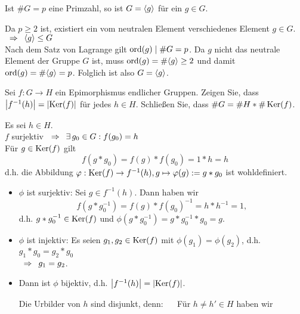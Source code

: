 \begin{exercisePage}
%
\setcounter{taskcount}{5}
%

\begin{exercise}
	Ist $\# G = p$ eine Primzahl, so ist $G = \langle g \rangle$ für ein $g \in G$.
\end{exercise}
\begin{solution}
	Da $p \geq 2$ ist, existiert ein vom neutralen Element verschiedenes Element $g \in G$. \\
	$\enskip \Rightarrow \enskip \langle g \rangle \leq G$ \\
	Nach dem Satz von Lagrange gilt $\operatorname{ord}(g) \mid \# G = p$. Da $g$ nicht das neutrale Element der Gruppe $G$ ist, muss $\operatorname{ord}(g) = \# \langle g \rangle \geq 2$  und damit $\operatorname{ord}(g) = \# \langle g \rangle = p$. Folglich ist also $G = \langle g \rangle$.
\end{solution}
%
\begin{exercise}
	Sei $f: G \to H$ ein Epimorphismus endlicher Gruppen. Zeigen Sie, dass $\left| f^{-1}(h) \right| = \left| \operatorname{Ker}(f) \right|$ für jedes $h \in H$. Schließen Sie, dass $\# G = \# H * \# \operatorname{Ker}(f)$.
\end{exercise}
\begin{solution}
	Es sei $h \in H$. \\
	$f$ surjektiv $\enskip \Rightarrow \enskip \exists \, g_0 \in G : f(g_0)=h$ \\
	Für $g \in \operatorname{Ker} (f)$ gilt 
	\begin{equation*}
		f(g*g_0) = f(g) * f(g_0) = 1 * h = h
	\end{equation*}
	d.h. die Abbildung $\varphi :  \operatorname{Ker}(f) \to f^{-1}(h), g \mapsto \varphi(g) := g * g_0$ ist wohldefiniert.
	\begin{itemize}
		\item $\phi$ ist surjektiv: Sei $g \in f^{-1}(h)$. Dann haben wir
		\begin{equation*}
			f(g*g_0^{-1}) = f(g) * f(g_0)^{-1} = h * h^{-1} = 1,
		\end{equation*}
		d.h. $g*g_0^{-1} \in \operatorname{Ker}(f)$ und $\phi(g*g_0^{-1})=g*g_0^{-1}*g_0 = g$.
		\item $\phi$ ist injektiv: Es seien $g_1,g_2 \in \operatorname{Ker}(f)$ mit $\phi(g_1) = \phi(g_2)$, d.h. $g_1 * g_0 = g_2 * g_0$ \\
		$\enskip \Rightarrow \enskip g_1 = g_2$.
		\item Dann ist $\phi$ bijektiv, d.h. $\left| f^{-1}(h) \right| = \left| \operatorname{Ker}(f) \right|$. \par \medskip
		Die Urbilder von $h$ sind disjunkt, denn: $\quad$
		Für $h \neq h' \in H$ haben wir

\end{itemize}
\end{solution}
\end{exercisePage}
